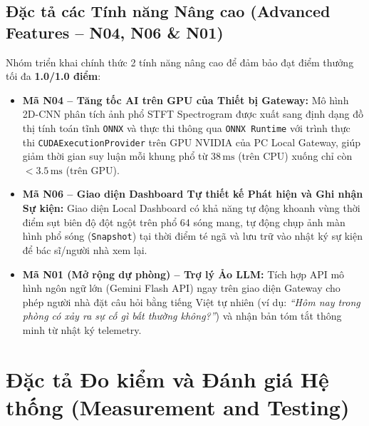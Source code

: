 \documentclass{hcmut-report}
\begin{document}
\subsection[Đặc tả các Tính năng Nâng cao (N04, N06, N01)]{Đặc tả các Tính năng Nâng cao (Advanced Features -- N04, N06 \& N01)}
Nhóm triển khai chính thức 2 tính năng nâng cao để đảm bảo đạt điểm thưởng tối đa \textbf{1.0/1.0 điểm}:
\begin{itemize}
  \item \textbf{Mã N04 -- Tăng tốc AI trên GPU của Thiết bị Gateway:} Mô hình 2D-CNN phân tích ảnh phổ STFT Spectrogram được xuất sang định dạng đồ thị tính toán tĩnh \texttt{ONNX} và thực thi thông qua \texttt{ONNX Runtime} với trình thực thi \texttt{CUDAExecutionProvider} trên GPU NVIDIA của PC Local Gateway, giúp giảm thời gian suy luận mỗi khung phổ từ $38\,\text{ms}$ (trên CPU) xuống chỉ còn $<3.5\,\text{ms}$ (trên GPU).
  \item \textbf{Mã N06 -- Giao diện Dashboard Tự thiết kế Phát hiện và Ghi nhận Sự kiện:} Giao diện Local Dashboard có khả năng tự động khoanh vùng thời điểm sụt biên độ đột ngột trên phổ 64 sóng mang, tự động chụp ảnh màn hình phổ sóng (\texttt{Snapshot}) tại thời điểm té ngã và lưu trữ vào nhật ký sự kiện để bác sĩ/người nhà xem lại.
  \item \textbf{Mã N01 (Mở rộng dự phòng) -- Trợ lý Ảo LLM:} Tích hợp API mô hình ngôn ngữ lớn (Gemini Flash API) ngay trên giao diện Gateway cho phép người nhà đặt câu hỏi bằng tiếng Việt tự nhiên (ví dụ: \textit{``Hôm nay trong phòng có xảy ra sự cố gì bất thường không?''}) và nhận bản tóm tắt thông minh từ nhật ký telemetry.
\end{itemize}

\section[Đặc tả Đo kiểm và Đánh giá Hệ thống]{Đặc tả Đo kiểm và Đánh giá Hệ thống (Measurement and Testing)}
\end{document}
